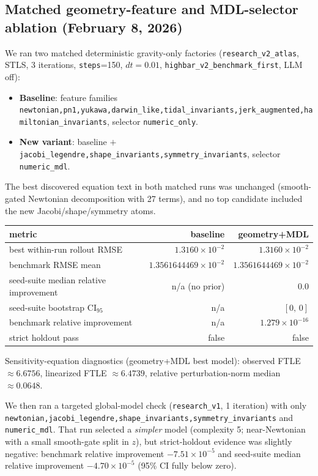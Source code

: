 \documentclass[11pt]{article}
\begin{document}
\subsection{Matched geometry-feature and MDL-selector ablation (February 8, 2026)}
We ran two matched deterministic gravity-only factories (\texttt{research\_v2\_atlas}, STLS, 3 iterations, \texttt{steps}=150, $dt=0.01$, \texttt{highbar\_v2\_benchmark\_first}, LLM off):
\begin{itemize}
\item \textbf{Baseline}: feature families \texttt{newtonian,pn1,yukawa,darwin\_like,tidal\_invariants,jerk\_augmented,hamiltonian\_invariants}, selector \texttt{numeric\_only}.
\item \textbf{New variant}: baseline $+$ \texttt{jacobi\_legendre,shape\_invariants,symmetry\_invariants}, selector \texttt{numeric\_mdl}.
\end{itemize}

The best discovered equation text in both matched runs was unchanged (smooth-gated Newtonian decomposition with 27 terms), and no top candidate included the new Jacobi/shape/symmetry atoms.

\begin{center}
\begin{tabular}{lrr}
\hline
metric & baseline & geometry+MDL \\
\hline
best within-run rollout RMSE & $1.3160\times 10^{-2}$ & $1.3160\times 10^{-2}$ \\
benchmark RMSE mean & $1.3561644469\times 10^{-2}$ & $1.3561644469\times 10^{-2}$ \\
seed-suite median relative improvement & n/a (no prior) & $0.0$ \\
seed-suite bootstrap CI$_{95}$ & n/a & $[0,\,0]$ \\
benchmark relative improvement & n/a & $1.279\times 10^{-16}$ \\
strict holdout pass & false & false \\
\hline
\end{tabular}
\end{center}

Sensitivity-equation diagnostics (geometry+MDL best model): observed FTLE $\approx 6.6756$, linearized FTLE $\approx 6.4739$, relative perturbation-norm median $\approx 0.0648$.

We then ran a targeted global-model check (\texttt{research\_v1}, 1 iteration) with only \texttt{newtonian,jacobi\_legendre,shape\_invariants,symmetry\_invariants} and \texttt{numeric\_mdl}. That run selected a \emph{simpler} model (complexity 5; near-Newtonian with a small smooth-gate split in $z$), but strict-holdout evidence was slightly negative: benchmark relative improvement $-7.51\times10^{-5}$ and seed-suite median relative improvement $-4.70\times10^{-5}$ (95\% CI fully below zero).
\end{document}
